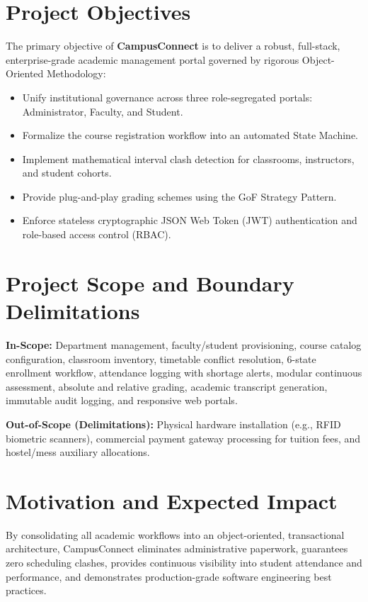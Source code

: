 \documentclass[12pt,a4paper,oneside]{report}
\begin{document}
\section{Project Objectives}
The primary objective of \textbf{CampusConnect} is to deliver a robust, full-stack, enterprise-grade academic management portal governed by rigorous Object-Oriented Methodology:
\begin{itemize}
    \item Unify institutional governance across three role-segregated portals: Administrator, Faculty, and Student.
    \item Formalize the course registration workflow into an automated State Machine.
    \item Implement mathematical interval clash detection for classrooms, instructors, and student cohorts.
    \item Provide plug-and-play grading schemes using the GoF Strategy Pattern.
    \item Enforce stateless cryptographic JSON Web Token (JWT) authentication and role-based access control (RBAC).
\end{itemize}

\section{Project Scope and Boundary Delimitations}
\textbf{In-Scope:}
Department management, faculty/student provisioning, course catalog configuration, classroom inventory, timetable conflict resolution, 6-state enrollment workflow, attendance logging with shortage alerts, modular continuous assessment, absolute and relative grading, academic transcript generation, immutable audit logging, and responsive web portals.

\noindent
\textbf{Out-of-Scope (Delimitations):}
Physical hardware installation (e.g., RFID biometric scanners), commercial payment gateway processing for tuition fees, and hostel/mess auxiliary allocations.

\section{Motivation and Expected Impact}
By consolidating all academic workflows into an object-oriented, transactional architecture, CampusConnect eliminates administrative paperwork, guarantees zero scheduling clashes, provides continuous visibility into student attendance and performance, and demonstrates production-grade software engineering best practices.
\end{document}
